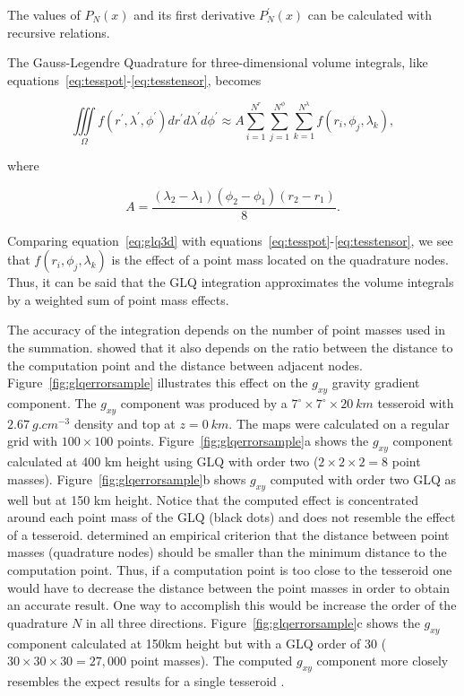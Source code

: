 \documentclass[paper,twocolumn]{geophysics}
\begin{document}
\noindent
The values of $P_N(x)$ and its first derivative $P^\prime_N(x)$
can be calculated with recursive relations.

The Gauss-Legendre Quadrature for three-dimensional volume integrals,
like equations~\ref{eq:tesspot}-\ref{eq:tesstensor},
becomes \citep{Asgharzadeh2007}

\begin{equation}
    \iiint\limits_{\Omega}
    f(r^\prime, \lambda^\prime, \phi^\prime)
    dr^\prime d\lambda^\prime d\phi^\prime
    \approx
    A
    \sum\limits_{i=1}^{N^r}
    \sum\limits_{j=1}^{N^\phi}
    \sum\limits_{k=1}^{N^\lambda}
    f(r_i, \phi_j, \lambda_k),
    \label{eq:glq3d}
\end{equation}

\noindent
where

\begin{equation}
    A = \frac{(\lambda_2 - \lambda_1)(\phi_2 - \phi_1)(r_2 - r_1)}{8}.
\end{equation}

Comparing equation~\ref{eq:glq3d} with
equations~\ref{eq:tesspot}-\ref{eq:tesstensor},
we see that $f(r_i, \phi_j, \lambda_k)$ is the effect of a point
mass located on the quadrature nodes.
Thus, it can be said that the GLQ integration
approximates the volume integrals  by a
weighted sum of point mass effects.

The accuracy of the integration
depends on the number of point masses used in the summation.
\citet{Ku1977} showed that it also depends on the ratio between
the distance to the computation point and the distance between adjacent nodes.
Figure~\ref{fig:glqerrorsample}
illustrates this effect on the $g_{xy}$ gravity gradient component.
The $g_{xy}$ component was produced by a
$7^\circ \times 7^\circ \times 20\ km$ tesseroid
with $2.67\ g.cm^{-3}$ density
and top at $z=0\ km$.
The maps were calculated on a regular grid
with $100\times100$ points.
Figure~\ref{fig:glqerrorsample}a shows the $g_{xy}$ component
calculated at 400 km height using
GLQ with order two ($2 \times 2 \times 2 = 8$ point masses).
Figure~\ref{fig:glqerrorsample}b shows $g_{xy}$ computed with order two
GLQ as well but at 150 km height.
Notice that the computed effect is concentrated around each point mass
of the GLQ (black dots) and does not resemble the effect of a tesseroid.
\citet{Ku1977} determined an empirical criterion that the distance between
point masses (quadrature nodes) should be smaller than the minimum distance to
the computation point.
Thus, if a computation point is too close to the tesseroid one would have to
decrease the distance between the point masses in order to obtain an accurate
result.
One way to accomplish this would be increase the order of the quadrature
$N$ in all three directions.
Figure~\ref{fig:glqerrorsample}c shows the $g_{xy}$ component calculated at
150km height but with a GLQ order of 30
($30 \times 30 \times 30 = 27,000$ point masses).
The computed $g_{xy}$ component more closely resembles
the expect results for a single tesseroid \citep{Asgharzadeh2007}.
\end{document}
